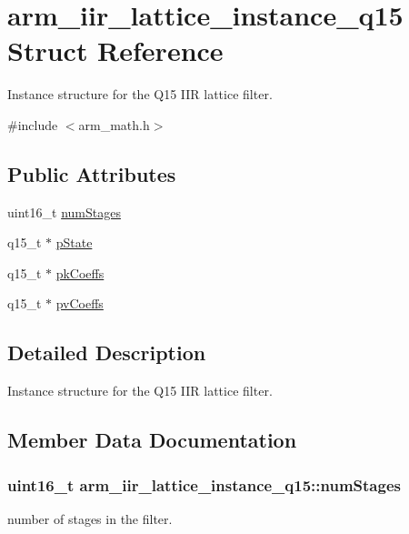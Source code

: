 \hypertarget{structarm__iir__lattice__instance__q15}{}\section{arm\+\_\+iir\+\_\+lattice\+\_\+instance\+\_\+q15 Struct Reference}
\label{structarm__iir__lattice__instance__q15}


Instance structure for the Q15 I\+IR lattice filter.  




{\ttfamily \#include $<$arm\+\_\+math.\+h$>$}

\subsection*{Public Attributes}
\begin{DoxyCompactItemize}
\item 
uint16\+\_\+t \hyperlink{structarm__iir__lattice__instance__q15_a96fbed313bef01070409fa182d26ba3f}{num\+Stages}
\item 
q15\+\_\+t $\ast$ \hyperlink{structarm__iir__lattice__instance__q15_afd0136ab917b529554d93f41a5e04618}{p\+State}
\item 
q15\+\_\+t $\ast$ \hyperlink{structarm__iir__lattice__instance__q15_a41c214a1ec38d4a82fae8899d715dd29}{pk\+Coeffs}
\item 
q15\+\_\+t $\ast$ \hyperlink{structarm__iir__lattice__instance__q15_a4c4f57f45b223abbe2a9fb727bd2cad9}{pv\+Coeffs}
\end{DoxyCompactItemize}


\subsection{Detailed Description}
Instance structure for the Q15 I\+IR lattice filter. 

\subsection{Member Data Documentation}
\subsubsection[{\texorpdfstring{num\+Stages}{numStages}}]{\setlength{\rightskip}{0pt plus 5cm}uint16\+\_\+t arm\+\_\+iir\+\_\+lattice\+\_\+instance\+\_\+q15\+::num\+Stages}\hypertarget{structarm__iir__lattice__instance__q15_a96fbed313bef01070409fa182d26ba3f}{}\label{structarm__iir__lattice__instance__q15_a96fbed313bef01070409fa182d26ba3f}
number of stages in the filter. 
